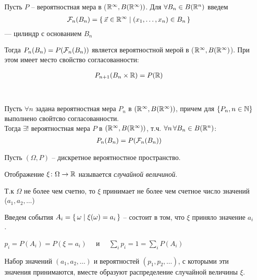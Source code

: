
Пусть $P$ -- вероятностная мера в ($\mathbb{R}^{\infty}, B(\mathbb{R}^{\infty}))$.
Для $\forall B_n \in B(\mathbb{R}^n)$ введем
\begin{align*}
	\mathcal{F}_n (B_n) = \left\{ \, \vec{x} \in \mathbb{R}^{\infty} \mid (x_1, \ldots, x_n) \in B_n \, \right\}
\end{align*}
--- цилиндр с основанием $B_n$

Тогда $P_n(B_n) = P(\mathcal{F}_n(B_n))$ является вероятностной мерой в ($\mathbb{R}^{\infty}, B(\mathbb{R}^{\infty})$).
При этом имеет место свойство согласованности:

\begin{align*}
	P_{n + 1}(B_n \times \mathbb{R}) = P(\mathbb{R})
\end{align*}

\begin{theorem}~

	Пусть $\forall n$ задана вероятностная мера $P_n$  в $(\mathbb{R}^{\infty}, B(\mathbb{R}^{\infty}))$, 
	причем для $\{ P_n, n \in \mathbb{N} \}$ выполнено свойтсво согласованности.\\
	Тогда $\exists !$ вероятностная мера $P$ в $(\mathbb{R}^{\infty}, B(\mathbb{R}^{\infty}))$,
	т.ч. $\forall n \, \forall B_n \in B(\mathbb{R}^n)$:
	\begin{align*}
		P_n(B_n) = P(\mathcal{F}_n(B_n))
	\end{align*}
\end{theorem}


Пусть $(\Omega, P)$ -- дискретное вероятностное пространство.

\begin{definition}
	Отображение $\xi\colon \Omega \to \mathbb{R}$ называется \emph{случайной величиной}.

	Т.к $\Omega$ не более чем счетно, 
	то $\xi$ принимает не более чем счетное число значений ($a_1, a_2, \ldots$)

	Введем события $A_i = \left\{ \, \omega \mid \xi(\omega) = a_i \, \right\}$ 
	-- состоит в том, что $\xi$ приняло значение $a_i$.
	
	$p_i = P(A_i) = P(\xi = a_i) \quad$ и $\quad \sum\limits_i p_i = 1 = \sum\limits_i P(A_i)$
\end{definition}

\begin{definition}
	Набор значений $(a_1, a_2, \ldots)$ и вероятностей $(p_1, p_2, \ldots)$, с которыми эти значения принимаются, вместе образуют распределение случайной величины $\xi$.
\end{definition}

